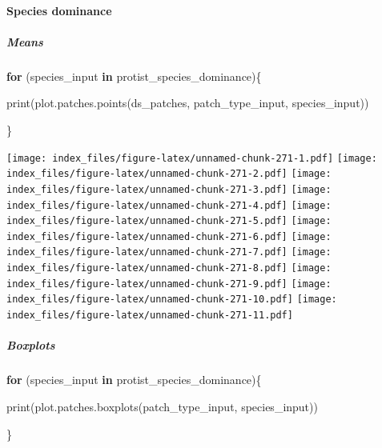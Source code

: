 \documentclass[
]{article}
\newenvironment{Shaded}{\begin{snugshade}}{\end{snugshade}}
\newcommand{\ControlFlowTok}[1]{\textcolor[rgb]{0.13,0.29,0.53}{\textbf{#1}}}
\newcommand{\FunctionTok}[1]{\textcolor[rgb]{0.00,0.00,0.00}{#1}}
\newcommand{\NormalTok}[1]{#1}
\begin{document}
\hypertarget{species-dominance}{%
\paragraph{Species dominance}\label{species-dominance}}

\hypertarget{means-12}{%
\subparagraph{Means}\label{means-12}}

\begin{Shaded}
\begin{Highlighting}[]
\ControlFlowTok{for}\NormalTok{ (species\_input }\ControlFlowTok{in}\NormalTok{ protist\_species\_dominance)\{}
  
  \FunctionTok{print}\NormalTok{(}\FunctionTok{plot.patches.points}\NormalTok{(ds\_patches, patch\_type\_input,}
\NormalTok{                              species\_input))}
  
\NormalTok{\}}
\end{Highlighting}
\end{Shaded}

\texttt{[image: index\_files/figure-latex/unnamed-chunk-271-1.pdf]}
\texttt{[image: index\_files/figure-latex/unnamed-chunk-271-2.pdf]}
\texttt{[image: index\_files/figure-latex/unnamed-chunk-271-3.pdf]}
\texttt{[image: index\_files/figure-latex/unnamed-chunk-271-4.pdf]}
\texttt{[image: index\_files/figure-latex/unnamed-chunk-271-5.pdf]}
\texttt{[image: index\_files/figure-latex/unnamed-chunk-271-6.pdf]}
\texttt{[image: index\_files/figure-latex/unnamed-chunk-271-7.pdf]}
\texttt{[image: index\_files/figure-latex/unnamed-chunk-271-8.pdf]}
\texttt{[image: index\_files/figure-latex/unnamed-chunk-271-9.pdf]}
\texttt{[image: index\_files/figure-latex/unnamed-chunk-271-10.pdf]}
\texttt{[image: index\_files/figure-latex/unnamed-chunk-271-11.pdf]}

\hypertarget{boxplots-12}{%
\subparagraph{Boxplots}\label{boxplots-12}}

\begin{Shaded}
\begin{Highlighting}[]
\ControlFlowTok{for}\NormalTok{ (species\_input }\ControlFlowTok{in}\NormalTok{ protist\_species\_dominance)\{}
  
  \FunctionTok{print}\NormalTok{(}\FunctionTok{plot.patches.boxplots}\NormalTok{(patch\_type\_input,}
\NormalTok{                              species\_input))}
  
\NormalTok{\}}
\end{Highlighting}
\end{Shaded}
\end{document}
